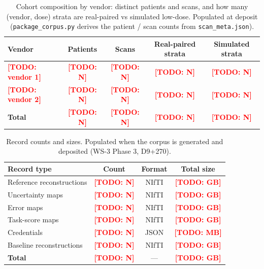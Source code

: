 \documentclass{article}
\newcommand{\todo}[1]{\textcolor{red}{\textbf{[TODO: #1]}}}
\begin{document}
\begin{table}[h]
    \centering
    \small
    \begin{tabular}{lcccc}
        \toprule
        \textbf{Vendor} & \textbf{Patients} & \textbf{Scans} & \textbf{Real-paired strata} & \textbf{Simulated strata} \\
        \midrule
        \todo{vendor 1} & \todo{N} & \todo{N} & \todo{N} & \todo{N} \\
        \todo{vendor 2} & \todo{N} & \todo{N} & \todo{N} & \todo{N} \\
        \midrule
        \textbf{Total}  & \todo{N} & \todo{N} & \todo{N} & \todo{N} \\
        \bottomrule
    \end{tabular}
    \caption{Cohort composition by vendor: distinct patients and scans, and
    how many (vendor, dose) strata are real-paired vs simulated low-dose.
    Populated at deposit (\texttt{package\_corpus.py} derives the patient /
    scan counts from \texttt{scan\_meta.json}).}
    \label{tab:cohort}
\end{table}

\begin{table}[h]
    \centering
    \small
    \begin{tabular}{lccc}
        \toprule
        \textbf{Record type} & \textbf{Count} & \textbf{Format} & \textbf{Total size} \\
        \midrule
        Reference reconstructions & \todo{N} & NIfTI & \todo{GB} \\
        Uncertainty maps          & \todo{N} & NIfTI & \todo{GB} \\
        Error maps                & \todo{N} & NIfTI & \todo{GB} \\
        Task-score maps           & \todo{N} & NIfTI & \todo{GB} \\
        Credentials               & \todo{N} & JSON  & \todo{MB} \\
        Baseline reconstructions  & \todo{N} & NIfTI & \todo{GB} \\
        \midrule
        \textbf{Total}            & \todo{N} & --- & \todo{GB} \\
        \bottomrule
    \end{tabular}
    \caption{Record counts and sizes. Populated when the corpus is
    generated and deposited (WS-3 Phase 3, D9+270).}
    \label{tab:records_counts}
\end{table}
\end{document}
